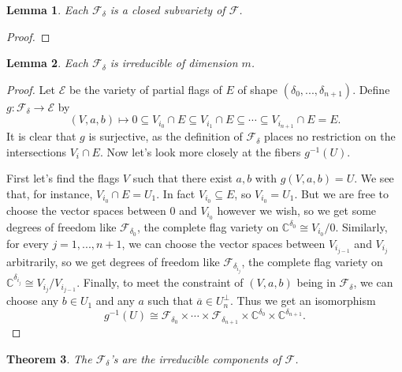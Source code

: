 \documentclass[12pt,psamsfonts]{article}
\newtheorem{theorem}{Theorem}[section]
\newtheorem{lemma}[theorem]{Lemma}
\begin{document}
\begin{lemma}
    Each \(\mathcal{F}_\delta\) is a closed subvariety of \(\mathcal{F}\).
\end{lemma}
\begin{proof}
    
\end{proof}

\begin{lemma}
    Each \(\mathcal{F}_\delta\) is irreducible of dimension \(m\).
\end{lemma}
\begin{proof}
    Let \(\mathcal{E}\) be the variety of partial flags of \(E\) of shape \((\delta_0, ..., \delta_{n + 1})\).
    Define \(g : \mathcal{F}_\delta \to \mathcal{E}\) by
    \[(V, a, b) \mapsto 0 \subseteq V_{i_0} \cap E \subseteq V_{i_1} \cap E \subseteq \cdots \subseteq V_{i_{n + 1}} \cap E = E.\]
    It is clear that \(g\) is surjective, as the definition of \(\mathcal{F}_\delta\) places no restriction on the intersections \(V_i \cap E\).
    Now let's look more closely at the fibers \(g^{-1}(U)\).
    \par First let's find the flags \(V\) such that there exist \(a, b\) with \(g(V, a, b) = U\).
    We see that, for instance, \(V_{i_0} \cap E = U_1\).
    In fact \(V_{i_0} \subseteq E\), so \(V_{i_0} = U_1\).
    But we are free to choose the vector spaces between \(0\) and \(V_{i_0}\) however we wish, so we get some degrees of freedom like \(\mathcal{F}_{\delta_0}\), the complete flag variety on \(\mathbb{C}^{\delta_0} \cong V_{i_0} / 0\).
    Similarly, for every \(j = 1, ..., n + 1\), we can choose the vector spaces between \(V_{i_{j - 1}}\) and \(V_{i_j}\) arbitrarily, so we get degrees of freedom like \(\mathcal{F}_{\delta_{i_j}}\), the complete flag variety on \(\mathbb{C}^{\delta_{i_j}} \cong V_{i_j} / V_{i_{j - 1}}\).
    Finally, to meet the constraint of \((V, a, b)\) being in \(\mathcal{F}_\delta\), we can choose any \(b \in U_1\) and any \(a\) such that \(\overline{a} \in U_n^\perp\).
    Thus we get an isomorphism
    \[g^{-1}(U) \cong \mathcal{F}_{\delta_0} \times \cdots \times \mathcal{F}_{\delta_{n + 1}} \times \mathbb{C}^{\delta_0} \times \mathbb{C}^{\delta_{n + 1}}.\]

\end{proof}

\begin{theorem}
    The \(\mathcal{F}_\delta\)'s are the irreducible components of \(\mathcal{F}\).
\end{theorem}
\end{document}
